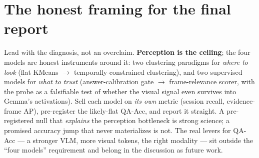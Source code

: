 \documentclass[11pt]{article}
\begin{document}
\section{The honest framing for the final report}
Lead with the diagnosis, not an overclaim. \textbf{Perception is the ceiling}; the four models are honest instruments around it: two clustering paradigms for \emph{where to look} (flat KMeans $\to$ temporally-constrained clustering), and two supervised models for \emph{what to trust} (answer-calibration gate $\to$ frame-relevance scorer, with the probe as a falsifiable test of whether the visual signal even survives into Gemma's activations). Sell each model on \emph{its own} metric (session recall, evidence-frame AP), pre-register the likely-flat QA-Acc, and report it straight. A pre-registered null that \emph{explains} the perception bottleneck is strong science; a promised accuracy jump that never materializes is not. The real levers for QA-Acc --- a stronger VLM, more visual tokens, the right modality --- sit outside the ``four models'' requirement and belong in the discussion as future work.
\end{document}
